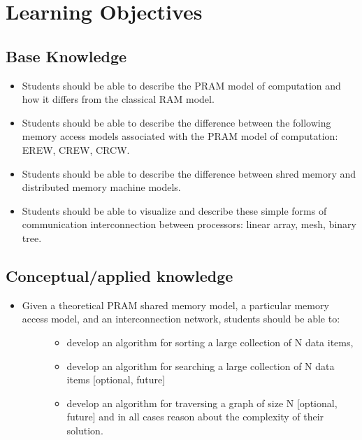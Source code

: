 \documentclass[letterpaper,10pt,openany,oneside]{sphinxmanual}
\begin{document}
\section{Learning Objectives}
\label{ParallelMachineModels/ParallelMachineModels:learning-objectives}

\subsection{Base Knowledge}
\label{ParallelMachineModels/ParallelMachineModels:base-knowledge}\begin{itemize}
\item {} 
Students should be able to describe the PRAM model of computation and how it differs from the classical RAM model.

\item {} 
Students should be able to describe the difference between the following memory access models associated with the PRAM model of computation: EREW, CREW, CRCW.

\item {} 
Students should be able to describe the difference between shred memory and distributed memory machine models.

\item {} 
Students should be able to visualize and describe these simple forms of communication interconnection between processors: linear array, mesh, binary tree.

\end{itemize}


\subsection{Conceptual/applied knowledge}
\label{ParallelMachineModels/ParallelMachineModels:conceptual-applied-knowledge}\begin{itemize}
\item {} \begin{description}
\item[{Given a theoretical PRAM shared memory model, a particular memory access model, and an interconnection network, students should be able to:}] \leavevmode\begin{itemize}
\item {} 
develop an algorithm for sorting a large collection of N data items,

\item {} 
develop an algorithm for searching a large collection of N data items {[}optional, future{]}

\item {} 
develop an algorithm for traversing a graph of size N {[}optional, future{]} and in all cases reason about the complexity of their solution.

\end{itemize}

\end{description}

\end{itemize}
\end{document}
